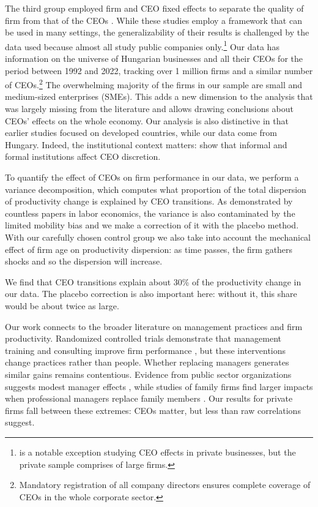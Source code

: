 \documentclass[11pt,a4paper]{article}
\begin{document}
The third group employed firm and CEO fixed effects to separate the quality of firm from that of the CEOs \citep{Bertrand2003-io, crossland2011differences, quigley2015has}. While these studies employ a framework that can be used in many settings, the generalizability of their results is challenged by the data used because almost all study public companies only.\footnote{\citet{quigley2022ceo} is a notable exception studying CEO effects in private businesses, but the private sample comprises of large firms.} Our data has information on the universe of Hungarian businesses and all their CEOs for the period between 1992 and 2022, tracking over 1 million firms and a similar number of CEOs.\footnote{Mandatory registration of all company directors ensures complete coverage of CEOs in the whole corporate sector.} The overwhelming majority of the firms in our sample are small and medium-sized enterprises (SMEs). This adds a new dimension to the analysis that was largely missing from the literature and allows drawing conclusions about CEOs' effects on the whole economy. Our analysis is also distinctive in that earlier studies focused on developed countries, while our data come from Hungary. Indeed, the institutional context matters: \citet{crossland2011differences} show that informal and formal institutions affect CEO discretion.

To quantify the effect of CEOs on firm performance in our data, we perform a variance decomposition, which computes what proportion of the total dispersion of productivity change is explained by CEO transitions. As demonstrated by countless papers in labor economics, the variance is also contaminated by the limited mobility bias and we make a correction of it with the  placebo method. With our carefully chosen control group we also take into account the mechanical effect of firm age on productivity dispersion: as time passes, the firm gathers shocks and so the dispersion will increase. 

We find that CEO transitions explain about 30\% of the productivity change in our data. The placebo correction is also important here: without it, this share would be about twice as large.

Our work connects to the broader literature on management practices and firm productivity. Randomized controlled trials demonstrate that management training and consulting improve firm performance \citep{bloom2013does, mckenzie2021small}, but these interventions change practices rather than people. Whether replacing managers generates similar gains remains contentious. Evidence from public sector organizations suggests modest manager effects \citep{fenizia2022managers, janke2024role}, while studies of family firms find larger impacts when professional managers replace family members \citep{bennedsen2007inside, sraer2007performance}. Our results for private firms fall between these extremes: CEOs matter, but less than raw correlations suggest.
\end{document}
